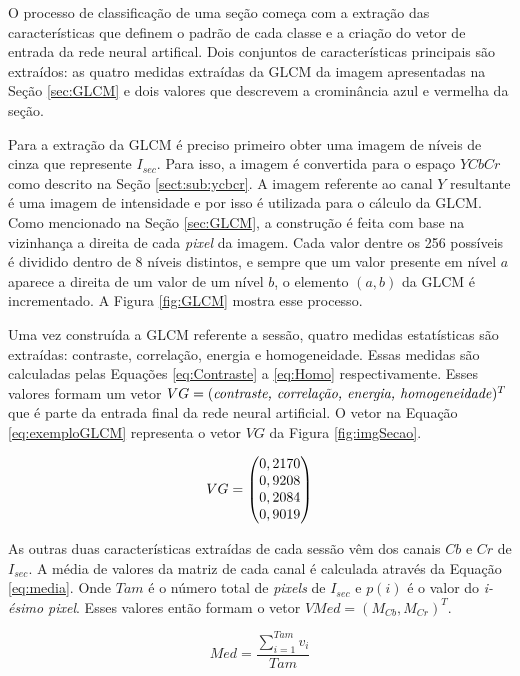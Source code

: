 O processo de classificação de uma seção começa com a extração das características que definem o padrão de cada classe e a criação do vetor de entrada da rede neural artifical. Dois conjuntos de características principais são extraídos: as quatro medidas extraídas da GLCM da imagem apresentadas na Seção \ref{sec:GLCM} e dois valores que descrevem a crominância azul e vermelha da seção.

Para a extração da GLCM é preciso primeiro obter uma imagem de níveis de cinza que represente $I_{sec}$. Para isso, a imagem é convertida para o espaço $YCbCr$ como descrito na Seção \ref{sect:sub:ycbcr}. A imagem referente ao canal $Y$ resultante é uma imagem de intensidade e por isso é utilizada para o cálculo da GLCM. Como mencionado na Seção \ref{sec:GLCM}, a construção é feita com base na vizinhança a direita de cada \textit{pixel} da imagem. Cada valor dentre os 256 possíveis é dividido dentro de 8 níveis distintos, e sempre que um valor presente em nível $a$ aparece a direita de um valor de um nível $b$, o elemento $(a,b)$ da GLCM é incrementado. A Figura \ref{fig:GLCM} mostra esse processo.

Uma vez construída a GLCM referente a sessão, quatro medidas estatísticas são extraídas: contraste, correlação, energia e homogeneidade. Essas medidas são calculadas pelas Equações \ref{eq:Contraste} a \ref{eq:Homo} respectivamente. Esses valores formam um vetor $VG = (\text{\textit{contraste, correlação, energia, homogeneidade}})^T$ que é parte da entrada final da rede neural artificial. O vetor na Equação \ref{eq:exemploGLCM} representa o vetor $VG$ da Figura \ref{fig:imgSecao}.

\begin{equation}
\centering
	VG = \begin{pmatrix}
	0,2170\\0,9208\\0,2084\\0,9019
	\end{pmatrix}
\centering
\label{eq:exemploGLCM}
\end{equation}

As outras duas características extraídas de cada sessão vêm dos canais $Cb$ e $Cr$ de $I_{sec}$. A média de valores da matriz de cada canal é calculada através da Equação \ref{eq:media}. Onde $Tam$ é o número total de \textit{pixels} de $I_{sec}$ e $p(i)$ é o valor do \textit{i-ésimo pixel}. Esses valores então formam o vetor $VMed = (M_{Cb}, M_{Cr})^T$.

\begin{equation}
	Med = \frac{\sum_{i=1}^{Tam} v_i}{Tam}
\label{eq:media}
\end{equation}

